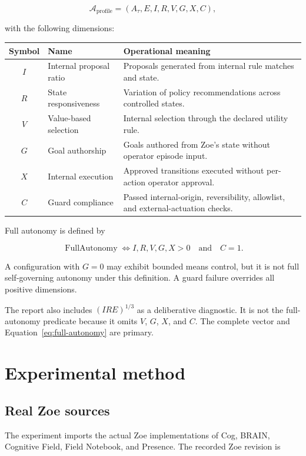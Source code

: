 \documentclass[11pt,a4paper]{article}
\begin{document}
\begin{equation}
\mathcal A_{\mathrm{profile}}=(A_\tau,E,I,R,V,G,X,C),
\end{equation}

with the following dimensions:

\begin{center}
\begin{tabular}{clp{8.7cm}}
\toprule
Symbol & Name & Operational meaning \\
\midrule
$I$ & Internal proposal ratio & Proposals generated from internal rule matches and state. \\
$R$ & State responsiveness & Variation of policy recommendations across controlled states. \\
$V$ & Value-based selection & Internal selection through the declared utility rule. \\
$G$ & Goal authorship & Goals authored from Zoe's state without operator episode input. \\
$X$ & Internal execution & Approved transitions executed without per-action operator approval. \\
$C$ & Guard compliance & Passed internal-origin, reversibility, allowlist, and external-actuation checks. \\
\bottomrule
\end{tabular}
\end{center}

Full autonomy is defined by

\begin{equation}
\boxed{
\operatorname{FullAutonomy}
\iff I,R,V,G,X>0\quad\text{and}\quad C=1.
}
\label{eq:full-autonomy}
\end{equation}

A configuration with $G=0$ may exhibit bounded means control, but it is not full self-governing autonomy under this definition. A guard failure overrides all positive dimensions.

The report also includes $(IRE)^{1/3}$ as a deliberative diagnostic. It is not the full-autonomy predicate because it omits $V$, $G$, $X$, and $C$. The complete vector and Equation~\ref{eq:full-autonomy} are primary.

\section{Experimental method}
\subsection{Real Zoe sources}
The experiment imports the actual Zoe implementations of Cog, BRAIN, Cognitive Field, Field Notebook, and Presence. The recorded Zoe revision is
\end{document}
